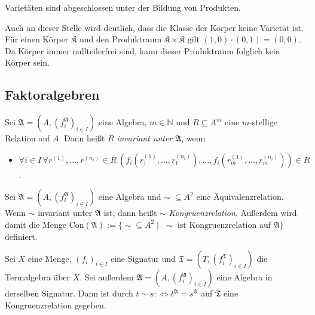 \begin{corollary}\label{corollary:prod-varietaeten}
    Varietäten sind abgeschlossen unter der Bildung von Produkten.
\end{corollary}

\begin{remark}
    Auch an dieser Stelle wird deutlich, dass die Klasse der Körper keine Varietät ist. Für einen Körper $\mathfrak{K}$
    und den Produktraum $\mathfrak{K}\times \mathfrak{K}$ gilt $(1,0)\cdot (0,1)=(0,0)$. Da Körper immer nullteilerfrei sind,
    kann dieser Produktraum folglich kein Körper sein.
\end{remark}


\subsection{Faktoralgebren}

\begin{definition}
    Sei $\mathfrak{A}=(A,(f^\mathfrak{A}_i)_{i\in I})$ eine Algebra, $m\in\mathbb{N}$ und $R\subseteq A^m$ eine $m$-stellige
    Relation auf $A$. Dann heißt $R$ \emph{invariant unter $\mathfrak{A}$}, wenn
    \begin{itemize}
        \item $\forall i\in I\,\forall r^{(1)},\ldots,r^{(n_i)}\in R\ (f_i(r_1^{(1)},\ldots,r_1^{(n_i)}),\ldots,f_i(r_m^{(1)},\ldots,r_m^{(n_i)}))\in R$.
    \end{itemize}
\end{definition}

\begin{definition}
    Sei $\mathfrak{A}=(A,(f^\mathfrak{A}_i)_{i\in I})$ eine Algebra und $\sim\;\subseteq A^2$ eine Äquivalenzrelation.
    Wenn $\sim$ invariant unter $\mathfrak{A}$ ist, dann heißt $\sim$ \emph{Kongruenzrelation}. Außerdem wird damit die Menge
    Con$(\mathfrak{A}):=\{\sim\subseteq A^2\mid \;\sim \text{ ist Kongruenzrelation auf }\mathfrak{A}\}$ definiert.
\end{definition}

\begin{example}
    Sei $X$ eine Menge, $(f_i)_{i\in I}$ eine Signatur und $\mathfrak{T}=(T,(f^\mathfrak{T}_i)_{i\in I})$ die Termalgebra über $X$.
    Sei außerdem $\mathfrak{A}=(A,(f^\mathfrak{A}_i)_{i\in I})$ eine Algebra in derselben Signatur. Dann ist durch
    $t\sim s:\Leftrightarrow t^\mathfrak{A}=s^\mathfrak{A}$ auf $\mathfrak{T}$ eine Kongruenzrelation gegeben.
\end{example}

